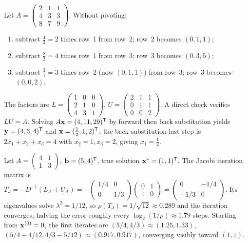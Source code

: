 \begin{example}
\label{ex:lu-3x3}
Let $A = \begin{pmatrix} 2 & 1 & 1 \\ 4 & 3 & 3 \\ 8 & 7 & 9 \end{pmatrix}$.
Without pivoting:
\begin{enumerate}[label=(\arabic*)]
  \item subtract $\tfrac{4}{2} = 2$ times row~1 from row~2; row~2
        becomes $(0, 1, 1)$;
  \item subtract $\tfrac{8}{2} = 4$ times row~1 from row~3; row~3
        becomes $(0, 3, 5)$;
  \item subtract $\tfrac{3}{1} = 3$ times row~2 (now $(0, 1, 1)$)
        from row~3; row~3 becomes $(0, 0, 2)$.
\end{enumerate}
The factors are
$L = \begin{pmatrix} 1 & 0 & 0 \\ 2 & 1 & 0 \\ 4 & 3 & 1 \end{pmatrix}$,
$U = \begin{pmatrix} 2 & 1 & 1 \\ 0 & 1 & 1 \\ 0 & 0 & 2 \end{pmatrix}$.
A direct check verifies $LU = A$. Solving $A \mathbf{x} = (4, 11, 29)^{\mathsf{T}}$
by forward then back substitution yields
$\mathbf{y} = (4, 3, 4)^{\mathsf{T}}$ and $\mathbf{x} = (\tfrac{1}{2}, 1, 2)^{\mathsf{T}}$;
the back-substitution last step is $2 x_1 + x_2 + x_3 = 4$ with
$x_2 = 1, x_3 = 2$, giving $x_1 = \tfrac{1}{2}$.
\end{example}

\begin{example}
\label{ex:jacobi}
Let $A = \begin{pmatrix} 4 & 1 \\ 1 & 3 \end{pmatrix}$, $\mathbf{b} = (5, 4)^{\mathsf{T}}$, true solution $\mathbf{x}^* = (1, 1)^{\mathsf{T}}$.
The Jacobi iteration matrix is
$T_J = -D^{-1}(L_A + U_A) = -\begin{pmatrix} 1/4 & 0 \\ 0 & 1/3 \end{pmatrix}\begin{pmatrix} 0 & 1 \\ 1 & 0 \end{pmatrix} = \begin{pmatrix} 0 & -1/4 \\ -1/3 & 0 \end{pmatrix}$.
Its eigenvalues solve $\lambda^2 = 1/12$, so $\rho(T_J) = 1/\sqrt{12} \approx 0.289$
and the iteration converges, halving the error roughly every
$\log_2(1/\rho) \approx 1.79$ steps. Starting from $\mathbf{x}^{(0)} = 0$,
the first iterates are $(5/4, 4/3) \approx (1.25, 1.33)$,
$(5/4 - 4/12, 4/3 - 5/12) \approx (0.917, 0.917)$, converging
visibly toward $(1, 1)$.
\end{example}


